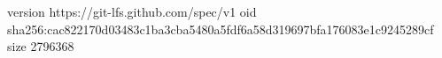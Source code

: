 version https://git-lfs.github.com/spec/v1
oid sha256:cac822170d03483c1ba3cba5480a5fdf6a58d319697bfa176083e1c9245289cf
size 2796368
